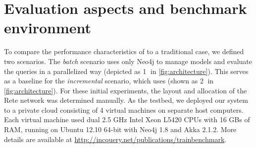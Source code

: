 



\label{benchmark_environment}
\section{Evaluation aspects and benchmark environment}

To compare the performance characteristics of \iqd{} to a traditional case, we defined two scenarios. The \textit{batch} scenario uses only Neo4j to manage models and evaluate the queries in a parallelized way (depicted as \textcircled{1} in \autoref{fig:architecture}). This serves as a baseline for the \textit{incremental} scenario, which uses \iqd{} (shown as \textcircled{2} in \autoref{fig:architecture}). For these initial experiments, the layout and allocation of the Rete network was determined manually. As the testbed, we deployed our system to a private cloud consisting of 4 virtual machines on separate host computers. Each virtual machine used dual 2.5 GHz Intel Xeon L5420 CPUs with 16 GBs of RAM, running on Ubuntu 12.10 64-bit with Neo4j 1.8 and Akka 2.1.2. More details are available at \url{http://incquery.net/publications/trainbenchmark}.

